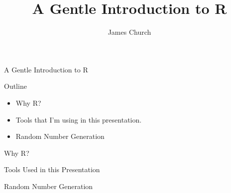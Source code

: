 \documentclass{beamer}
\author{James Church}
\title{A Gentle Introduction to R}
\begin{document}
\begin{frame}[plain] \titlepage \end{frame}

\begin{frame}{A Gentle Introduction to R}

    Outline

    \begin{itemize}
        \item Why R?
        \item Tools that I'm using in this presentation.
        \item Random Number Generation
    \end{itemize}

\end{frame}

\begin{frame}{Why R?}
\end{frame}

\begin{frame}{Tools Used in this Presentation}
\end{frame}

\begin{frame}{Random Number Generation}
\end{frame}
\end{document}
